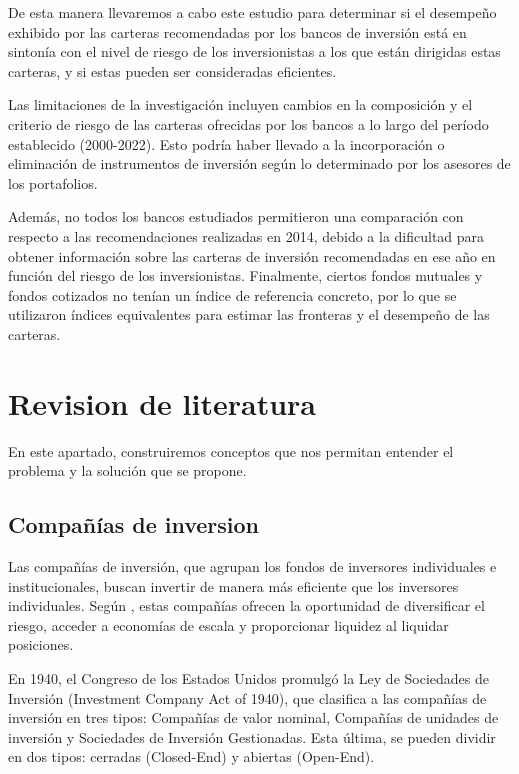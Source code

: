 \documentclass[a4paper,fleqn]{cas-sc}
\begin{document}
De esta manera llevaremos a cabo este estudio para determinar si el desempeño exhibido por las carteras recomendadas por los bancos de inversión está en sintonía con el nivel de riesgo de los inversionistas a los que están dirigidas estas carteras, y si estas pueden ser consideradas eficientes.

Las limitaciones de la investigación incluyen cambios en la composición y el criterio de riesgo de las carteras ofrecidas por los bancos a lo largo del período establecido (2000-2022). Esto podría haber llevado a la incorporación o eliminación de instrumentos de inversión según lo determinado por los asesores de los portafolios. 

Además, no todos los bancos estudiados permitieron una comparación con respecto a las recomendaciones realizadas en 2014, debido a la dificultad para obtener información sobre las carteras de inversión recomendadas en ese año en función del riesgo de los inversionistas. Finalmente, ciertos fondos mutuales y fondos cotizados no tenían un índice de referencia concreto, por lo que se utilizaron índices equivalentes para estimar las fronteras y el desempeño de las carteras.


\section{Revision de literatura}

En este apartado, construiremos conceptos que nos permitan entender el problema y la solución que se propone.

\subsection{Compañías de inversion}

Las compañías de inversión, que agrupan los fondos de inversores individuales e institucionales, buscan invertir de manera más eficiente que los inversores individuales. Según \cite{BECCALLI}, estas compañías ofrecen la oportunidad de diversificar el riesgo, acceder a economías de escala y proporcionar liquidez al liquidar posiciones.

En 1940, el Congreso de los Estados Unidos promulgó la Ley de Sociedades de Inversión (Investment Company Act of 1940), que clasifica a las compañías de inversión en tres tipos: Compañías de valor nominal, Compañías de unidades de inversión y Sociedades de Inversión Gestionadas. Esta última, se pueden dividir en dos tipos: cerradas (Closed-End) y abiertas (Open-End). 
\end{document}

